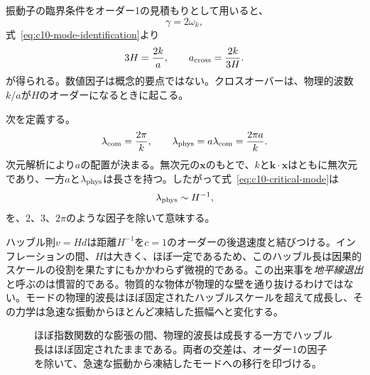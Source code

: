 振動子の臨界条件をオーダー1の見積もりとして用いると、
\[
\gamma=2\omega_k,
\]
式~\eqref{eq:c10-mode-identification}より
\begin{equation}
3H=\frac{2k}{a},
\qquad
a_{\rm cross}=\frac{2k}{3H}.
\label{eq:c10-critical-mode}
\end{equation}
が得られる。数値因子は概念的要点ではない。クロスオーバーは、物理的波数\(k/a\)が\(H\)のオーダーになるときに起こる。

次を定義する。
\[
\lambda_{\rm com}=\frac{2\pi}{k},
\qquad
\lambda_{\rm phys}=a\lambda_{\rm com}
=\frac{2\pi a}{k}.
\]
次元解析により\(a\)の配置が決まる。無次元の\(\mathbf x\)のもとで、\(k\)と\(\mathbf k\cdot\mathbf x\)はともに無次元であり、一方\(a\)と\(\lambda_{\rm phys}\)は長さを持つ。したがって式~\eqref{eq:c10-critical-mode}は
\begin{equation}
\lambda_{\rm phys}\sim H^{-1},
\label{eq:c10-horizon-crossing}
\end{equation}
を、\(2\)、\(3\)、\(2\pi\)のような因子を除いて意味する。

ハッブル則\(v=Hd\)は距離\(H^{-1}\)を\(c=1\)のオーダーの後退速度と結びつける。インフレーションの間、\(H\)は大きく、ほぼ一定であるため、このハッブル長は因果的スケールの役割を果たすにもかかわらず微視的である。この出来事を\emph{地平線退出}と呼ぶのは慣習的である。物質的な物体が物理的な壁を通り抜けるわけではない。モードの物理的波長はほぼ固定されたハッブルスケールを超えて成長し、その力学は急速な振動からほとんど凍結した振幅へと変化する。

\begin{figure}[htbp]
\centering
\begin{coursefitfigure}
\end{coursefitfigure}
\caption{ほぼ指数関数的な膨張の間、物理的波長は成長する一方でハッブル長はほぼ固定されたままである。両者の交差は、オーダー1の因子を除いて、急速な振動から凍結したモードへの移行を印づける。}
\label{fig:c10-horizon-reconstruction}
\end{figure}

